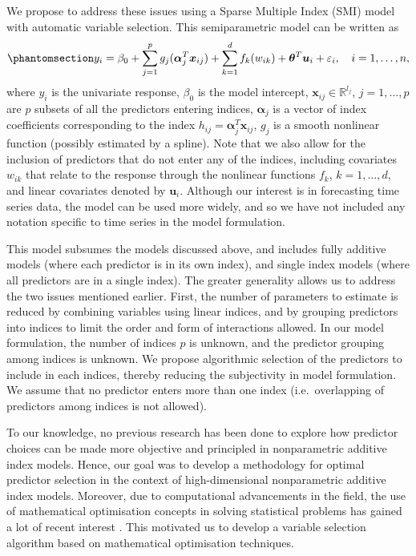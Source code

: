 \documentclass[
  11pt,
  a4paper,
]{article}
\begin{document}
We propose to address these issues using a Sparse Multiple Index (SMI)
model with automatic variable selection. This semiparametric model can
be written as \begin{equation}\phantomsection\label{eq-semipara}{
  y_{i} = \beta_{0} + \sum_{j = 1}^{p}g_{j}(\bm{\alpha}_{j}^{T}\bm{x}_{ij}) + \sum_{k = 1}^{d}f_{k}(w_{ik}) + \bm{\theta}^{T}\bm{u}_{i} + \varepsilon_{i}, \quad i = 1, \dots, n,
}\end{equation} where \(y_{i}\) is the univariate response,
\(\beta_{0}\) is the model intercept,
\(\bm{x}_{ij} \in \mathbb{R}^{l_{j}}\), \(j = 1, \dots, p\) are \(p\)
subsets of all the predictors entering indices, \(\bm{\alpha}_{j}\) is a
vector of index coefficients corresponding to the index
\(h_{ij} = \bm{\alpha}_{j}^{T}\bm{x}_{ij}\), \(g_{j}\) is a smooth
nonlinear function (possibly estimated by a spline). Note that we also
allow for the inclusion of predictors that do not enter any of the
indices, including covariates \(w_{ik}\) that relate to the response
through the nonlinear functions \(f_{k}\), \(k = 1, \dots, d\), and
linear covariates denoted by \(\bm{u}_{i}\). Although our interest is in
forecasting time series data, the model can be used more widely, and so
we have not included any notation specific to time series in the model
formulation.

This model subsumes the models discussed above, and includes fully
additive models (where each predictor is in its own index), and single
index models (where all predictors are in a single index). The greater
generality allows us to address the two issues mentioned earlier. First,
the number of parameters to estimate is reduced by combining variables
using linear indices, and by grouping predictors into indices to limit
the order and form of interactions allowed. In our model formulation,
the number of indices \(p\) is unknown, and the predictor grouping among
indices is unknown. We propose algorithmic selection of the predictors
to include in each indices, thereby reducing the subjectivity in model
formulation. We assume that no predictor enters more than one index
(i.e.~overlapping of predictors among indices is not allowed).

To our knowledge, no previous research has been done to explore how
predictor choices can be made more objective and principled in
nonparametric additive index models. Hence, our goal was to develop a
methodology for optimal predictor selection in the context of
high-dimensional nonparametric additive index models. Moreover, due to
computational advancements in the field, the use of mathematical
optimisation concepts in solving statistical problems has gained a lot
of recent interest \autocite{Theusl2020}. This motivated us to develop a
variable selection algorithm based on mathematical optimisation
techniques.
\end{document}
